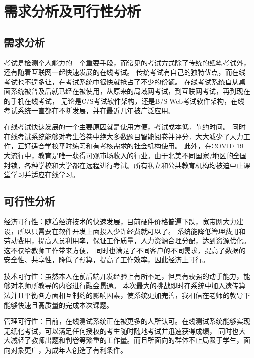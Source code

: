 \chapter{需求分析及可行性分析}

\section{需求分析}
考试是检测个人能力的一个重要手段，而常见的考试方式除了传统的纸笔考试外，还有随着互联网一起快速发展的在线考试。
传统考试有自己的独特优点，而在线考试也不遑多让，在考试系统中很快就抢占了不少的份额。
在线考试系统自从桌面系统被普及后就已经在被使用，从原来的局域网考试，到互联网考试，再到现在的手机在线考试，
无论是C/S考试软件架构，还是B/S Web考试软件架构，在线考试系统一直都在不断发展，并在最近几年被广泛应用。
\par
在线考试快速发展的一个主要原因就是使用方便，考试成本低，节约时间。
同时在线考试系统能够对考生答卷中绝大多数题目智能阅卷并评分，大大减少了人力工作，正好适合学校平时练习和有考核需求的社会机构使用。
此外，在COVID-19大流行中，教育是唯一获得可观市场收入的行业。由于北美不同国家/地区的全国封锁，各种学校和大学都在远程进行考试。所有私立和公共教育机构均被迫中止课堂学习并适应在线学习。
\section{可行性分析}
经济可行性：随着经济技术的快速发展，目前硬件价格普遍下跌，宽带网大力建设，所以只需要在软件开发上面投入少许经费就可以了。
系统能降低管理费用和劳动费用，提高人员利用率，保证工作质量，人力资源合理分配，达到资源优化。这不仅给教师工作带来方便，
同时也满足了不同客户的不同需求，提高了数据的安全性、共享性，降低了预算，提高了工作效率，因此经济上可行。
\par
技术可行性：虽然本人在前后端开发经验上有所不足，但具有较强的动手能力，能够对老师所教导的内容进行融会贯通。
本次最大的挑战即时在系统中加入遗传算法并且平衡各方面相互制约的影响因素，使系统更加完善，我相信在老师的教导下能够快速且高质量的完成本次课题。
\par
管理可行性：目前，在线测试系统正在被更多的人所认可。在线测试系统能够实现无纸化考试，可以满足任何授权的考生随时随地考试并迅速获得成绩，
同时也大大减轻了教师出题和判卷等繁重的工作量。而且所面向的群体不止局限于学生，面向对象更广，为成年人创造了有利条件。


